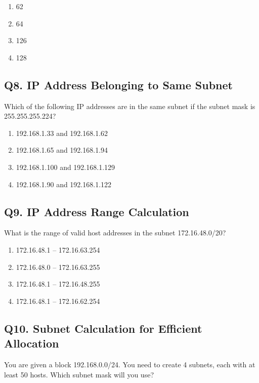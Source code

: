 \begin{enumerate}[label=(\alph*)]
    \item 62  
    \item 64  
    \item 126  
    \item 128  
\end{enumerate}

\vspace{1em}
\subsection*{Q8. IP Address Belonging to Same Subnet}
Which of the following IP addresses are in the same subnet if the subnet mask is 255.255.255.224?

\begin{enumerate}[label=(\alph*)]
    \item 192.168.1.33 and 192.168.1.62  
    \item 192.168.1.65 and 192.168.1.94  
    \item 192.168.1.100 and 192.168.1.129  
    \item 192.168.1.90 and 192.168.1.122  
\end{enumerate}

\vspace{1em}
\subsection*{Q9. IP Address Range Calculation}
What is the range of valid host addresses in the subnet 172.16.48.0/20?

\begin{enumerate}[label=(\alph*)]
    \item 172.16.48.1 – 172.16.63.254  
    \item 172.16.48.0 – 172.16.63.255  
    \item 172.16.48.1 – 172.16.48.255  
    \item 172.16.48.1 – 172.16.62.254  
\end{enumerate}

\vspace{1em}
\subsection*{Q10. Subnet Calculation for Efficient Allocation}
You are given a block 192.168.0.0/24. You need to create 4 subnets, each with at least 50 hosts. Which subnet mask will you use?

